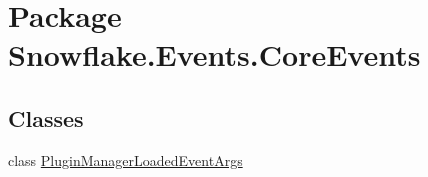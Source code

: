 \hypertarget{namespace_snowflake_1_1_events_1_1_core_events}{}\section{Package Snowflake.\+Events.\+Core\+Events}
\label{namespace_snowflake_1_1_events_1_1_core_events}
\subsection*{Classes}
\begin{DoxyCompactItemize}
\item 
class \hyperlink{class_snowflake_1_1_events_1_1_core_events_1_1_plugin_manager_loaded_event_args}{Plugin\+Manager\+Loaded\+Event\+Args}
\end{DoxyCompactItemize}
